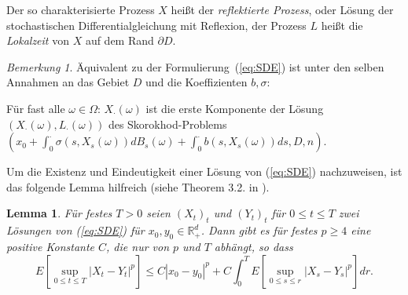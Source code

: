 \documentclass[10pt, a4paper, leqno, twoside, bibliography=totocnumbered, final]{scrartcl}
\theoremstyle{definition}
\theoremstyle{plain}%
\newtheorem{lemma}[defin]{Lemma}
\theoremstyle{remark}
\newtheorem*{bem}{Bemerkung}
\begin{document}
Der so charakterisierte Prozess $ X $ heißt der \emph{reflektierte Prozess}, oder Lösung der stochastischen Differentialgleichung mit Reflexion, der Prozess $ L $ heißt die \emph{Lokalzeit} von $ X $ auf dem Rand $ \partial D $. 

\begin{bem}
Äquivalent zu der Formulierung~(\ref{eq:SDE}) ist unter den selben Annahmen an das Gebiet $ D $ und die Koeffizienten $ b, \sigma $:

Für fast alle $ \omega \in \Omega $: $ X_{\cdot}(\omega) $ ist die erste Komponente der Lösung $ (X_{\cdot}(\omega), L_{\cdot}(\omega)) $ des Skorokhod-Problems $ (x_{0} +  \int_{0}^{\cdot} \sigma (s, X_{s}(\omega)) dB_{s}(\omega) + \int_0^{\cdot} b(s,X_{s}(\omega))ds, D, n) $.
\end{bem}

Um die Existenz und Eindeutigkeit einer Lösung von (\ref{eq:SDE}) nachzuweisen, ist das folgende Lemma hilfreich (siehe Theorem 3.2. in \cite{Andres-Diplom}).

\begin{lemma}
\label{sec:sebastianslemma}
Für festes $ T>0 $ seien $ (X_t)_t $ und $ (Y_t)_t $ für $ 0 \leq t \leq T $ zwei Lösungen von (\ref{eq:SDE}) für $ x_0, y_0 \in \mathbb{R}^d_+ $. Dann gibt es für festes $ p \geq 4 $ eine positive Konstante $ C $, die nur von $ p $ und $ T $ abhängt, so dass
\begin{equation}
\label{eq:sebastianslemma}
E \left[ \sup_{0\leq t \leq T} | X_t - Y_t |^{p} \right] \leq C | x_0 -y_0 |^{p} + C \int_0^T E \left[ \sup_{0\leq s \leq r} | X_s - Y_s |^{p} \right] dr.
\end{equation}
\end{lemma}
\end{document}
